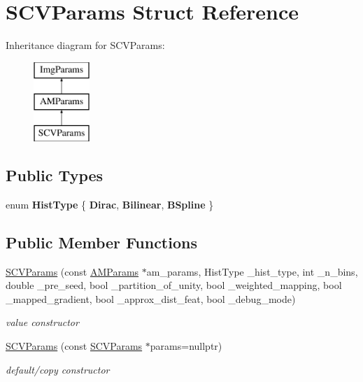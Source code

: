 \hypertarget{structSCVParams}{\section{S\-C\-V\-Params Struct Reference}
\label{structSCVParams}
}
Inheritance diagram for S\-C\-V\-Params\-:\begin{figure}[H]
\begin{center}
\leavevmode
\includegraphics[height=3.000000cm]{structSCVParams}
\end{center}
\end{figure}
\subsection*{Public Types}
\begin{DoxyCompactItemize}
\item 
enum {\bfseries Hist\-Type} \{ {\bfseries Dirac}, 
{\bfseries Bilinear}, 
{\bfseries B\-Spline}
 \}
\end{DoxyCompactItemize}
\subsection*{Public Member Functions}
\begin{DoxyCompactItemize}
\item 
\hypertarget{structSCVParams_a39b6e602d9ad593ca6fbf76cb8afbb33}{\hyperlink{structSCVParams_a39b6e602d9ad593ca6fbf76cb8afbb33}{S\-C\-V\-Params} (const \hyperlink{structAMParams}{A\-M\-Params} $\ast$am\-\_\-params, Hist\-Type \-\_\-hist\-\_\-type, int \-\_\-n\-\_\-bins, double \-\_\-pre\-\_\-seed, bool \-\_\-partition\-\_\-of\-\_\-unity, bool \-\_\-weighted\-\_\-mapping, bool \-\_\-mapped\-\_\-gradient, bool \-\_\-approx\-\_\-dist\-\_\-feat, bool \-\_\-debug\-\_\-mode)}\label{structSCVParams_a39b6e602d9ad593ca6fbf76cb8afbb33}

\begin{DoxyCompactList}\small\item\em value constructor \end{DoxyCompactList}\item 
\hypertarget{structSCVParams_ab9ec64f0f919564179aba437c34224df}{\hyperlink{structSCVParams_ab9ec64f0f919564179aba437c34224df}{S\-C\-V\-Params} (const \hyperlink{structSCVParams}{S\-C\-V\-Params} $\ast$params=nullptr)}\label{structSCVParams_ab9ec64f0f919564179aba437c34224df}

\begin{DoxyCompactList}\small\item\em default/copy constructor \end{DoxyCompactList}\end{DoxyCompactItemize}
